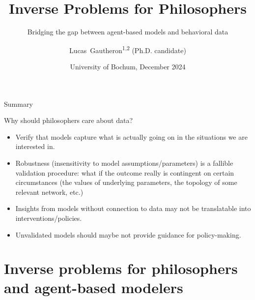 \documentclass[10pt]{beamer}
\title[Conventions] %
{
Inverse Problems for Philosophers
}
\subtitle{Bridging the gap between agent-based models and behavioral data}
\author[L.~Gautheron]
{Lucas~Gautheron\textsuperscript{1,2} (Ph.D. candidate)
}
\institute[IZWT, ENS] %
{
  \inst{1}
  Interdisciplinary Center for Science and Technology Studies, Wuppertal, Germany\\
  \inst{2} Département d'Études Cognitives, École Normale Supérieure, Paris, France
}
\date[13/12/2024] %
{University of Bochum, December 2024}
\begin{document}
\frame{
\titlepage
}

\begin{frame}{Summary}
    \tableofcontents
\end{frame}

\begin{frame}{Why should philosophers care about data?}
    \begin{itemize}
        \item<1-> Verify that models capture what is actually going on in the situations we are interested in.
        \item<2-> Robustness (insensitivity to model assumptions/parameters) is a fallible validation procedure: what if the outcome really is contingent on certain circumstances (the values of underlying parameters, the topology of some relevant network, etc.)
        \item<3-> Insights from models without connection to data may not be translatable into interventions/policies.
        \item<4-> Unvalidated models should maybe not provide guidance for policy-making.
    \end{itemize}

    \vspace{1em}
\end{frame}

\section{Inverse problems for philosophers and agent-based modelers}
\end{document}
